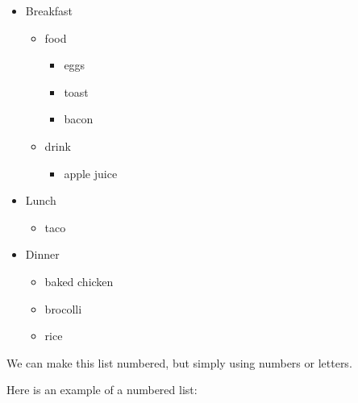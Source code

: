 \documentclass[
]{article}
\providecommand{\tightlist}{%
  \setlength{\itemsep}{0pt}\setlength{\parskip}{0pt}}
\begin{document}
\begin{itemize}
\tightlist
\item
  Breakfast

  \begin{itemize}
  \tightlist
  \item
    food

    \begin{itemize}
    \tightlist
    \item
      eggs
    \item
      toast
    \item
      bacon
    \end{itemize}
  \item
    drink

    \begin{itemize}
    \tightlist
    \item
      apple juice
    \end{itemize}
  \end{itemize}
\item
  Lunch

  \begin{itemize}
  \tightlist
  \item
    taco
  \end{itemize}
\item
  Dinner

  \begin{itemize}
  \tightlist
  \item
    baked chicken
  \item
    brocolli
  \item
    rice
  \end{itemize}
\end{itemize}

We can make this list numbered, but simply using numbers or letters.

Here is an example of a numbered list:
\end{document}
